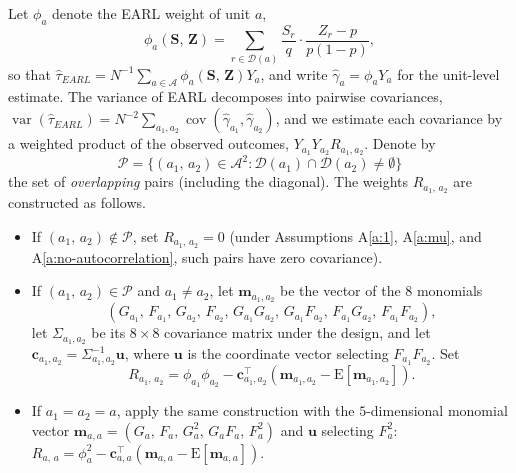 \documentclass[sigconf]{acmart}
\newcommand{\E}{\mathrm E}
\DeclareMathOperator{\var}{var}
\DeclareMathOperator{\cov}{cov}
\begin{document}
Let $\phi_a$ denote the EARL weight of unit $a$,
\begin{equation}\label{def:phi}
    \phi_a(\mathbf S,\,\mathbf Z) = \sum_{r\in\mathcal D(a)}\frac{S_r}{q}\cdot\frac{Z_r - p}{p(1-p)},
\end{equation}
so that $\hat\tau^{\phantom{1}}_{EARL} = N^{-1}\sum_{a\in\mathcal A}\phi_a(\mathbf S,\,\mathbf Z)Y_a$, and write $\hat\gamma_a = \phi_aY_a$ for the unit-level estimate. The variance of EARL decomposes into pairwise covariances, $\var(\hat\tau_{EARL}) = N^{-2}\sum_{a_1,a_2}\cov(\hat\gamma_{a_1},\hat\gamma_{a_2})$, and we estimate each covariance by a weighted product of the observed outcomes, $Y_{a_1}Y_{a_2}R_{a_1,a_2}$. Denote by
$$
\mathcal P = \{(a_1,\,a_2)\in\mathcal A^2\colon \mathcal D(a_1)\cap\mathcal D(a_2)\neq\emptyset\}
$$
the set of \emph{overlapping} pairs (including the diagonal). The weights $R_{a_1,\,a_2}$ are constructed as follows.
\begin{itemize}
    \item If $(a_1,\,a_2)\notin\mathcal P$, set $R_{a_1,\,a_2}=0$ (under Assumptions A\ref{a:1}, A\ref{a:mu}, and A\ref{a:no-autocorrelation}, such pairs have zero covariance).
    \item If $(a_1,\,a_2)\in\mathcal P$ and $a_1\neq a_2$, let $\mathbf m_{a_1,a_2}$ be the vector of the $8$ monomials
    \begin{equation*}
        (G_{a_1},\,F_{a_1},\,G_{a_2},\,F_{a_2},\,G_{a_1}G_{a_2},\,G_{a_1}F_{a_2},\,F_{a_1}G_{a_2},\,F_{a_1}F_{a_2}),
    \end{equation*}
    let $\Sigma_{a_1,a_2}$ be its $8\times 8$ covariance matrix under the design, and let $\mathbf c_{a_1,a_2} = \Sigma^{-1}_{a_1,a_2}\mathbf u$, where $\mathbf u$ is the coordinate vector selecting $F_{a_1}F_{a_2}$. Set
    \begin{equation}\label{def:R}
        R_{a_1,\,a_2} = \phi_{a_1}\phi_{a_2} - \mathbf c_{a_1,a_2}^{\top}\left(\mathbf m_{a_1,a_2} - \E[\mathbf m_{a_1,a_2}]\right).
    \end{equation}
    \item If $a_1=a_2=a$, apply the same construction with the $5$-dimen\-sional monomial vector $\mathbf m_{a,a} = (G_a,\,F_a,\,G_a^2,\,G_aF_a,\,F_a^2)$ and $\mathbf u$ selecting $F_a^2$:
    $R_{a,\,a} = \phi_{a}^2 - \mathbf c_{a,a}^{\top}(\mathbf m_{a,a} - \E[\mathbf m_{a,a}])$.
\end{itemize}
\end{document}
